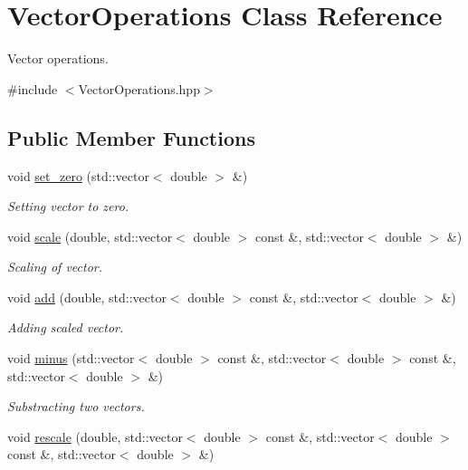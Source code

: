 \hypertarget{class_vector_operations}{}\section{Vector\+Operations Class Reference}
\label{class_vector_operations}


Vector operations.  




{\ttfamily \#include $<$Vector\+Operations.\+hpp$>$}

\subsection*{Public Member Functions}
\begin{DoxyCompactItemize}
\item 
void \hyperlink{class_vector_operations_abaea4dab7b207641d0fdbbc40fa65743}{set\+\_\+zero} (std\+::vector$<$ double $>$ \&)
\begin{DoxyCompactList}\small\item\em Setting vector to zero. \end{DoxyCompactList}\item 
void \hyperlink{class_vector_operations_aefb5af8e871c5918d3a523c4ac42925e}{scale} (double, std\+::vector$<$ double $>$ const \&, std\+::vector$<$ double $>$ \&)
\begin{DoxyCompactList}\small\item\em Scaling of vector. \end{DoxyCompactList}\item 
void \hyperlink{class_vector_operations_aa852ef14369e98477691b6c75efff644}{add} (double, std\+::vector$<$ double $>$ const \&, std\+::vector$<$ double $>$ \&)
\begin{DoxyCompactList}\small\item\em Adding scaled vector. \end{DoxyCompactList}\item 
void \hyperlink{class_vector_operations_a6682d17cc31ca7526ce9b59706d21daa}{minus} (std\+::vector$<$ double $>$ const \&, std\+::vector$<$ double $>$ const \&, std\+::vector$<$ double $>$ \&)
\begin{DoxyCompactList}\small\item\em Substracting two vectors. \end{DoxyCompactList}\item 
void \hyperlink{class_vector_operations_a2428a6bd64cffdac27f0bc8d5cfd96f8}{rescale} (double, std\+::vector$<$ double $>$ const \&, std\+::vector$<$ double $>$ const \&, std\+::vector$<$ double $>$ \&)

\end{DoxyCompactItemize}
